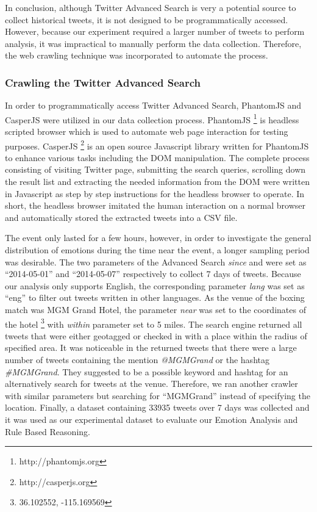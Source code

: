In conclusion, although Twitter Advanced Search is very a potential source to collect historical tweets, it is not designed to be programmatically accessed. However, because our experiment required a larger number of tweets to perform analysis, it was impractical to manually perform the data collection. Therefore, the web crawling technique was incorporated to automate the process.

\subsubsection{Crawling the Twitter Advanced Search}
In order to programmatically access Twitter Advanced Search, PhantomJS and CasperJS were utilized in our data collection process. PhantomJS \footnote{http://phantomjs.org} is headless scripted browser which is used to automate web page interaction for testing purposes. CasperJS \footnote{http://casperjs.org} is an open source Javascript library written for PhantomJS to enhance various tasks including the DOM manipulation. The complete process consisting of visiting Twitter page, submitting the search queries, scrolling down the result list and extracting the needed information from the DOM were written in Javascript as step by step instructions for the headless browser to operate. In short, the headless browser imitated the human interaction on a normal browser and automatically stored the extracted tweets into a CSV file.

The event only lasted for a few hours, however, in order to investigate the general distribution of emotions during the time near the event, a longer sampling period was desirable. The two parameters of the Advanced Search \textit{since} and  were set as ``2014-05-01'' and ``2014-05-07'' respectively to collect 7 days of tweets. Because our analysis only supports English, the corresponding parameter \textit{lang} was set as ``eng'' to filter out tweets written in other languages. As the venue of the boxing match was MGM Grand Hotel, the parameter \textit{near} was set to the coordinates of the hotel \footnote{36.102552, -115.169569} with \textit{within} parameter set to 5 miles. The search engine returned all tweets that were either geotagged or checked in with a place within the radius of specified area. It was noticeable in the returned tweets that there were a large number of tweets containing the mention \textit{@MGMGrand} or the hashtag \textit{\#MGMGrand}. They suggested to be a possible keyword and hashtag for an alternatively search for tweets at the venue. Therefore, we ran another crawler with similar parameters but searching for ``MGMGrand'' instead of specifying the location. Finally, a dataset containing 33935 tweets over 7 days was collected and it was used as our experimental dataset to evaluate our Emotion Analysis and Rule Based Reasoning.

